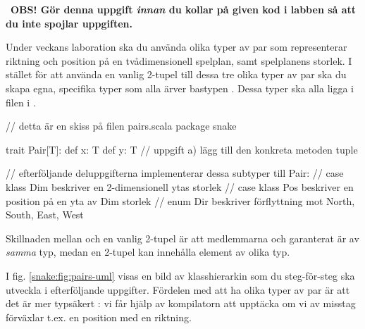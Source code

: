 \QUESTBEGIN


\Task\label{exe:inheritance:labprep-pair}  \what~\textbf{OBS! Gör denna uppgift \textit{innan} du kollar på given kod i labben så att du inte spojlar uppgiften.}

Under veckans laboration ska du använda olika typer av par som representerar riktning och position på en tvådimensionell spelplan, samt spelplanens storlek. I stället för att använda en vanlig 2-tupel till dessa tre olika typer av par ska du skapa egna, specifika  typer som alla ärver bastypen . Dessa typer ska alla ligga i filen  i .
\begin{Code}
// detta är en skiss på filen pairs.scala
package snake

trait Pair[T]:
  def x: T
  def y: T
  // uppgift a) lägg till den konkreta metoden tuple

// efterföljande deluppgifterna implementerar dessa subtyper till Pair:
//   case klass Dim beskriver en 2-dimensionell ytas storlek
//   case klass Pos beskriver en position på en yta av Dim storlek
//   enum Dir beskriver förflyttning mot North, South, East, West
\end{Code}
Skillnaden mellan  och en vanlig 2-tupel är att medlemmarna  och  garanterat är av \emph{samma} typ, medan en 2-tupel kan innehålla element av olika typ.

I fig. \ref{snake:fig:pairs-uml} visas en bild av klasshierarkin som du steg-för-steg ska utveckla i efterföljande  uppgifter. Fördelen med att ha olika typer av par är att det är mer typsäkert : vi får hjälp av kompilatorn att upptäcka om vi av misstag förväxlar t.ex. en position med en riktning.


